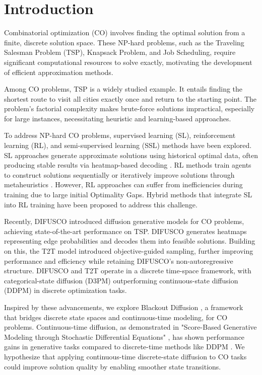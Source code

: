 \section{Introduction} \label{sec:intro}

Combinatorial optimization (CO) involves finding the optimal solution from a finite, discrete solution space. These NP-hard problems, such as the Traveling Salesman Problem (TSP), Knapsack Problem, and Job Scheduling, require significant computational resources to solve exactly, motivating the development of efficient approximation methods.

Among CO problems, TSP is a widely studied example. It entails finding the shortest route to visit all cities exactly once and return to the starting point. The problem's factorial complexity makes brute-force solutions impractical, especially for large instances, necessitating heuristic and learning-based approaches.

To address NP-hard CO problems, supervised learning (SL), reinforcement learning (RL), and semi-supervised learning (SSL) methods have been explored. SL approaches generate approximate solutions using historical optimal data, often producing stable results via heatmap-based decoding \cite{joshi2019tsp, sun2023difusco, li2023t2t}. RL methods train agents to construct solutions sequentially or iteratively improve solutions through metaheuristics \cite{kool2019attention, bresson2021transformer, zheng2021rl-lkh}. However, RL approaches can suffer from inefficiencies during training due to large initial Optimality Gaps. Hybrid methods that integrate SL into RL training have been proposed to address this challenge.

Recently, DIFUSCO \cite{sun2023difusco} introduced diffusion generative models for CO problems, achieving state-of-the-art performance on TSP. DIFUSCO generates heatmaps representing edge probabilities and decodes them into feasible solutions. Building on this, the T2T model \cite{li2023t2t} introduced objective-guided sampling, further improving performance and efficiency while retaining DIFUSCO's non-autoregressive structure. DIFUSCO and T2T operate in a discrete time-space framework, with categorical-state diffusion (D3PM) outperforming continuous-state diffusion (DDPM) in discrete optimization tasks.

Inspired by these advancements, we explore Blackout Diffusion \cite{santos2023blackout}, a framework that bridges discrete state spaces and continuous-time modeling, for CO problems. Continuous-time diffusion, as demonstrated in "Score-Based Generative Modeling through Stochastic Differential Equations" \cite{song2021sde}, has shown performance gains in generative tasks compared to discrete-time methods like DDPM \cite{ho2020ddpm}. We hypothesize that applying continuous-time discrete-state diffusion to CO tasks could improve solution quality by enabling smoother state transitions.

